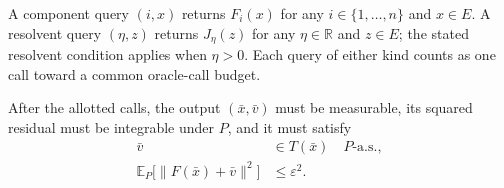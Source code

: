 \documentclass[10pt]{article}
\theoremstyle{definition}
\begin{document}
A component query $(i,x)$ returns $F_i(x)$ for any $i\in\{1,\ldots,n\}$ and $x\in E$. A resolvent query $(\eta,z)$ returns $J_\eta(z)$ for any $\eta\in\mathbb{R}$ and $z\in E$; the stated resolvent condition applies when $\eta>0$. Each query of either kind counts as one call toward a common oracle-call budget.

After the allotted calls, the output $(\bar{x},\bar{v})$ must be measurable, its squared residual must be integrable under $P$, and it must satisfy
\[
\begin{aligned}
\bar{v}&\in T(\bar{x})\quad P\text{-a.s.},\\
\mathbb{E}_{P}\bigl[\|F(\bar{x})+\bar{v}\|^2\bigr]
&\leq\varepsilon^2.
\end{aligned}
\]
\end{document}
